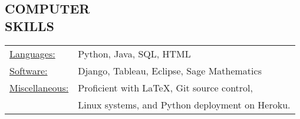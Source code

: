 \documentclass[line,margin]{res}
\begin{document}
\begin{resume}
\vspace*{.2cm}

\section{COMPUTER \\ SKILLS}

\begin{tabular}{ll}
   \underline{Languages:} & Python, Java, SQL, HTML\\
   \underline{Software:} & Django, Tableau, Eclipse, Sage Mathematics\\
   \underline{Miscellaneous:} & Proficient with LaTeX, Git source control,\\
    & Linux systems, and Python deployment on Heroku.
\end{tabular}


\end{resume}
\end{document}
